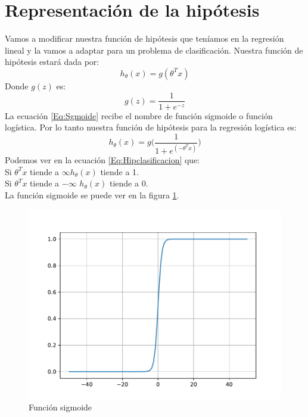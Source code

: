 \documentclass{report}
\begin{document}
\section{Representación de la hipótesis}
Vamos a modificar nuestra función de hipótesis que teníamos en la regresión lineal y la vamos a adaptar para un problema de clasificación. Nuestra función de hipótesis estará dada por:
\begin{equation}
	h_\theta(x)=g(\theta^Tx)
	\label{Eq:Hipclas}
\end{equation}
Donde $g(z)$ es:
\begin{equation}
	g(z)=\frac{1}{1+e^{-z}}
	\label{Eq:Sgmoide}
\end{equation}
La ecuación \ref{Eq:Sgmoide} recibe el nombre de función sigmoide o función logística. Por lo tanto nuestra función de hipótesis para la regresión logística es:
\begin{equation}
	h_\theta(x)=g\Big(\frac{1}{1+e^{(-\theta^Tx)}}\Big)
	\label{Eq:Hipclasificacion}
\end{equation}
Podemos ver en la ecuación \ref{Eq:Hipclasificacion} que:\\ Si $\theta^Tx$ tiende a $\infty$$ h_\theta(x) $ tiende a 1.\\ Si $ \theta^Tx $ tiende a $-\infty$ $ h_\theta(x) $ tiende a 0.\\La función sigmoide se puede ver en la figura \ref{Fig:Sig}. 
\begin{figure}[h]
	\centering
	\includegraphics[scale=0.5]{img/sigmoide}
	\caption{Función sigmoide}
	\label{Fig:Sig}
\end{figure}
\end{document}
